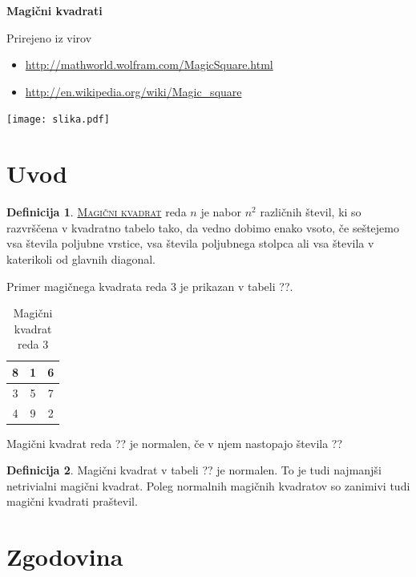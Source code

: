 \documentclass[a4paper,12pt]{article}
\newcommand{\pojem}[1]{\underline{\textsc{#1}}}
\theoremstyle{definition}
\newtheorem{definicija}{Definicija}
\theoremstyle{plain}
\begin{document}
\begin{center}
\textbf{\LARGE Magični kvadrati}
\end{center}
Prirejeno iz virov

\begin{itemize}
   \item \url{http://mathworld.wolfram.com/MagicSquare.html}
   \item \url{http://en.wikipedia.org/wiki/Magic_square}
\end{itemize}
\begin{center}
\texttt{[image: slika.pdf]}
\end{center}
\tableofcontents
\newpage
\section{Uvod}

\begin{definicija}
   \pojem{Magični kvadrat} reda $n$ je nabor $n^2$ različnih števil,
   ki so razvrščena v kvadratno tabelo tako, da vedno dobimo enako vsoto,
   če seštejemo vsa števila poljubne vrstice, vsa števila poljubnega
   stolpca ali vsa števila v katerikoli od glavnih diagonal.
\end{definicija}
Primer magičnega kvadrata reda 3 je prikazan v tabeli ??.

\begin{table}[!ht]
   \centering
   \caption{Magični kvadrat reda 3}
   \label{table:mag3}
\begin{tabular}{|c|c|c|}
   \hline
   8 & 1 & 6 \\
   \hline
   3 & 5 & 7 \\
   \hline
   4 & 9 & 2 \\
   \hline
\end{tabular}
\end{table} 
Magični kvadrat reda ?? je normalen, če v njem nastopajo števila
   ??
\begin{definicija}
Magični kvadrat v tabeli ?? je normalen.
To je tudi najmanjši netrivialni magični kvadrat.
Poleg normalnih magičnih kvadratov so zanimivi tudi magični kvadrati praštevil.
\end{definicija}

\section{Zgodovina}
\end{document}
